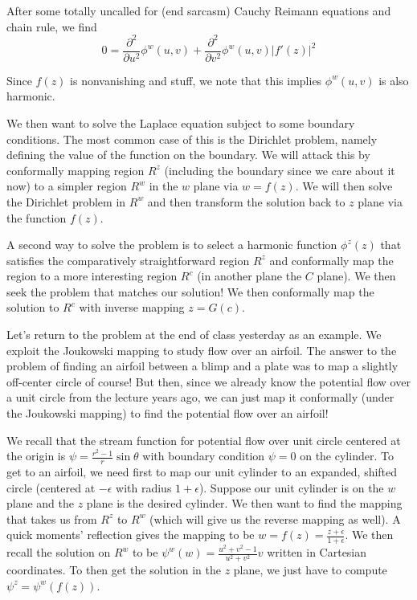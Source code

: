 \documentclass[10pt]{report}
\newcommand{\ptd}[2]{\frac{\partial^2 #1}{\partial#2^2}}
\newcommand{\abs}[1]{\left|#1\right|}
\begin{document}
After some totally uncalled for (end sarcasm) Cauchy Reimann equations and chain rule, we find
$$0 = \ptd{}{u} \phi^w(u,v) + \ptd{}{v}\phi^w(u,v)\abs{f'(z)}^2$$

Since $f(z)$ is nonvanishing and stuff, we note that this implies $\phi^w(u,v)$ is also harmonic. 

We then want to solve the Laplace equation subject to some boundary conditions. The most common case of this is the Dirichlet problem, namely defining the value of the function on the boundary. We will attack this by conformally mapping region $R^z$ (including the boundary since we care about it now) to a simpler region $R^w$ in the $w$ plane via $w = f(z)$. We will then solve the Dirichlet problem in $R^w$ and then transform the solution back to $z$ plane via the function $f(z)$.

A second way to solve the problem is to select a harmonic function $\phi^z(z)$ that satisfies the comparatively straightforward region $R^z$ and conformally map the region to a more interesting region $R^c$ (in another plane the $C$ plane). We then seek the problem that matches our solution! We then conformally map the solution to $R^c$ with inverse mapping $z = G(c)$.

Let's return to the problem at the end of class yesterday as an example. We exploit the Joukowski mapping to study flow over an airfoil. The answer to the problem of finding an airfoil between a blimp and a plate was to map a slightly off-center circle of course! But then, since we already know the potential flow over a unit circle from the lecture years ago, we can just map it conformally (under the Joukowski mapping) to find the potential flow over an airfoil!

We recall that the stream function for potential flow over unit circle centered at the origin is $\psi = \frac{r^2-1}{r}\sin\theta$ with boundary condition $\psi = 0$ on the cylinder. To get to an airfoil, we need first to map our unit cylinder to an expanded, shifted circle (centered at $-\epsilon$ with radius $1+\epsilon$). Suppose our unit cylinder is on the $w$ plane and the $z$ plane is the desired cylinder. We then want to find the mapping that takes us from $R^z$ to $R^w$ (which will give us the reverse mapping as well). A quick moments' reflection gives the mapping to be $w = f(z) = \frac{z+\epsilon}{1+\epsilon}$. We then recall the solution on $R^w$ to be $\psi^w(w) = \frac{u^2 + v^2 - 1}{u^2+v^2}v$ written in Cartesian coordinates. To then get the solution in the $z$ plane, we just have to compute $\psi^z = \psi^w(f(z))$. 
\end{document}
